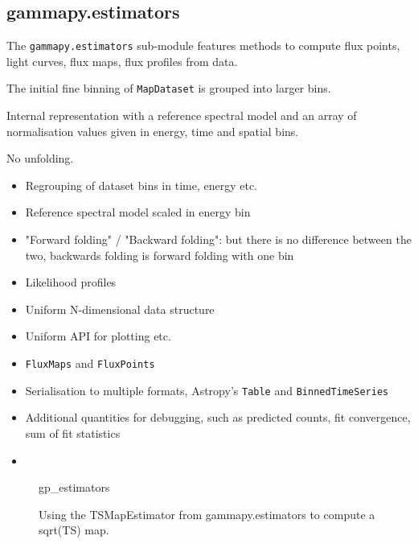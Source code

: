 \subsection{gammapy.estimators}
\label{ssec:gammapy-estimators}
The \verb|gammapy.estimators| sub-module features methods to compute flux
points, light curves, flux maps, flux profiles from data.

The initial fine binning of \verb|MapDataset| is grouped into larger bins.

Internal representation with a reference spectral model and an array of
normalisation values given in energy, time and spatial bins.

No unfolding.

\begin{itemize}
	\item Regrouping of dataset bins in time, energy etc.
	\item Reference spectral model scaled in energy bin
	\item "Forward folding" / "Backward folding": but there is no
	      difference between the two, backwards folding is forward folding with one bin
	\item Likelihood profiles \item Uniform N-dimensional data structure \item
	      Uniform API for plotting etc. \item \verb|FluxMaps| and \verb|FluxPoints| \item
	      Serialisation to multiple formats, Astropy's \verb|Table| and
	      \verb|BinnedTimeSeries|
	\item Additional quantities for debugging, such as predicted counts, fit convergence,
	      sum of fit statistics \item \end{itemize}

\begin{figure}
	{gp_estimators}
	\caption{Using the TSMapEstimator from gammapy.estimators to compute a
		sqrt(TS) map.} \label{fig*:minted:gp_estimators} \end{figure}
